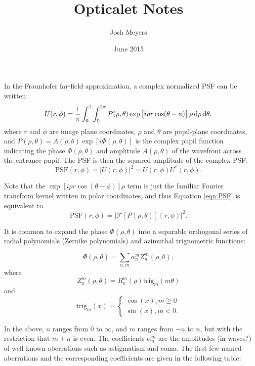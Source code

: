 \documentclass{article}
\title{Opticalet Notes}
\author{Josh Meyers}
\date{June 2015}
\newcommand{\trig}{\mathrm{trig}}
\begin{document}
In the Fraunhofer far-field approximation, a complex normalized PSF can be written:
\begin{equation}
  \label{eqn:cPSF}
  U(r, \phi) = \frac{1}{\pi} \int_0^1 \int_0^{2\pi} P(\rho, \theta) \exp\left[i \rho r \cos(\theta - \phi)\right]\rho \dif{\rho} \dif{\theta}, 
\end{equation}
where $r$ and $\phi$ are image plane coordinates, $\rho$ and $\theta$ are pupil-plane coordinates, and $P(\rho, \theta) = A(\rho, \theta) \exp\left[i \Phi(\rho, \theta)\right]$ is the complex pupil function indicating the phase $\Phi(\rho, \theta)$ and amplitude $A(\rho, \theta)$ of the wavefront across the entrance pupil.  The PSF is then the squared amplitude of the complex PSF:
\begin{equation}
  \label{eqn:PSF}
  \mathrm{PSF}(r, \phi) = \left|U(r, \phi)\right|^2 = U(r, \phi) U^*(r, \phi).
\end{equation}

Note that the $\exp\left[i \rho r \cos(\theta - \phi)\right]\rho$ term is just the familiar Fourier transform kernel written in polar coordinates, and thus Equation \ref{eqn:PSF} is equivalent to
\begin{equation}
  \label{eqn:FT_PSF}
  \mathrm{PSF}(r, \phi) = \left|\mathcal{F}\left[P(\rho, \theta)\right](r, \phi)\right|^2.
\end{equation}

It is common to expand the phase $\Phi(\rho, \theta)$ into a separable orthogonal series of radial polynomials (Zernike polynomials) and azimuthal trignometric functions:

\begin{equation}
  \Phi(\rho, \theta) = \sum_{n,m}\alpha_n^m Z_n^m(\rho, \theta),
\end{equation}
where
\begin{equation}
  Z_n^m(\rho, \theta) = R^m_n(\rho) \trig_m(m \theta)
\end{equation}
and
\begin{equation}
  \trig_m(x) = 
  \begin{cases}
    \cos(x), m \ge 0 \\
    \sin(x), m < 0.
  \end{cases}
\end{equation}

In the above, $n$ ranges from $0$ to $\infty$, and $m$ ranges from $-n$ to $n$, but with the restriction that $m+n$ is even.
The coefficients $\alpha_n^m$ are the amplitudes (in waves?) of well known aberrations such as astigmatism and coma.  The first few named aberrations and the corresponding coefficients are given in the following table:
\end{document}
